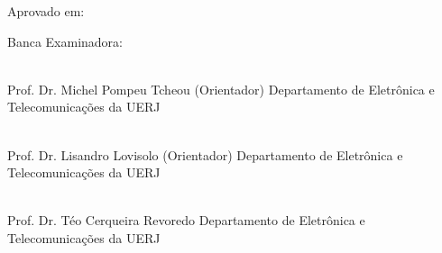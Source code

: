 \addtocounter{page}{+1}
\begin{center}

\setNomeAluno

\vspace{1cm}

\textbf{\setTitulo}

\end{center}

\vspace{.4cm}

\begin{flushright}
\parbox{8cm}{
}
\end{flushright}

\vspace{.6cm}



\noindent Aprovado em: \setApprovalDate

\noindent Banca Examinadora:


%
%
%
%



\vspace{.7cm}

\begin{flushright}
\parbox{12cm}{

\singlespacing

\hrulefill \\

\vspace{-.4cm}
Prof. Dr. Michel Pompeu Tcheou (Orientador)
\newline
Departamento de Eletrônica e Telecomunicações da UERJ
\vspace{.7cm}

\hrulefill \\

\vspace{-.4cm}
Prof. Dr. Lisandro Lovisolo (Orientador)
\newline
Departamento de Eletrônica e Telecomunicações da UERJ
\vspace{.7cm}


\hrulefill \\

\vspace{-.4cm}
Prof. Dr. Téo Cerqueira Revoredo
\newline
Departamento de Eletrônica e Telecomunicações da UERJ
\vspace{.7cm}

}

\end{flushright}
\vfill
	

\begin{center}
\setLocationDate
\end{center}
